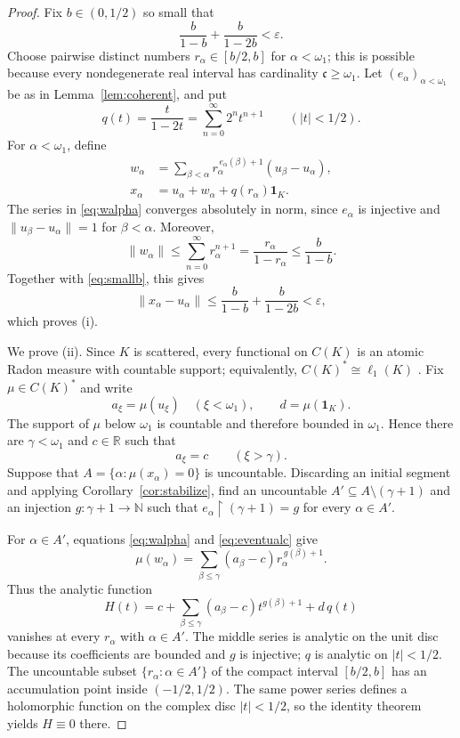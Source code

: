 \documentclass[11pt]{article}
\theoremstyle{remark}
\newcommand{\one}{\mathbf 1}
\newcommand{\N}{\mathbb N}
\newcommand{\R}{\mathbb R}
\begin{document}
\begin{proof}
Fix $b\in(0,1/2)$ so small that
\begin{equation}\label{eq:smallb}
  \frac{b}{1-b}+\frac{b}{1-2b}<\varepsilon.
\end{equation}
Choose pairwise distinct numbers
$r_\alpha\in[b/2,b]$ for $\alpha<\omega_1$; this is possible because every
nondegenerate real interval has cardinality $\mathfrak c\ge\omega_1$.  Let
$(e_\alpha)_{\alpha<\omega_1}$ be as in Lemma~\ref{lem:coherent}, and put
\[
  q(t)=\frac{t}{1-2t}=\sum_{n=0}^{\infty}2^n t^{n+1}
  \qquad(|t|<1/2).
\]
For $\alpha<\omega_1$, define
\begin{align}
  w_\alpha
    &=\sum_{\beta<\alpha}
      r_\alpha^{\,e_\alpha(\beta)+1}(u_\beta-u_\alpha),
      \label{eq:walpha}\\
  x_\alpha
    &=u_\alpha+w_\alpha+q(r_\alpha)\one_K.
      \label{eq:xalpha}
\end{align}
The series in \eqref{eq:walpha} converges absolutely in norm, since
$e_\alpha$ is injective and $\|u_\beta-u_\alpha\|=1$ for $\beta<\alpha$.
Moreover,
\[
  \|w_\alpha\|
  \le\sum_{n=0}^{\infty}r_\alpha^{n+1}
  =\frac{r_\alpha}{1-r_\alpha}
  \le\frac b{1-b}.
\]
Together with \eqref{eq:smallb}, this gives
\[
  \|x_\alpha-u_\alpha\|
  \le \frac b{1-b}+\frac b{1-2b}<\varepsilon,
\]
which proves (i).

We prove (ii).  Since $K$ is scattered, every functional on $C(K)$ is an
atomic Radon measure with countable support; equivalently,
$C(K)^*\cong\ell_1(K)$ \cite{Rudin}.  Fix $\mu\in C(K)^*$ and write
\[
  a_\xi=\mu(u_\xi)\quad(\xi<\omega_1),
  \qquad d=\mu(\one_K).
\]
The support of $\mu$ below $\omega_1$ is countable and therefore bounded in
$\omega_1$.  Hence there are $\gamma<\omega_1$ and $c\in\R$ such that
\begin{equation}\label{eq:eventualc}
  a_\xi=c\qquad(\xi>\gamma).
\end{equation}
Suppose that $A=\{\alpha:\mu(x_\alpha)=0\}$ is uncountable.  Discarding an
initial segment and applying Corollary~\ref{cor:stabilize}, find an uncountable
$A'\subseteq A\setminus(\gamma+1)$ and an injection
$g:\gamma+1\to\N$ such that
$e_\alpha\!\upharpoonright(\gamma+1)=g$ for every $\alpha\in A'$.

For $\alpha\in A'$, equations \eqref{eq:walpha} and
\eqref{eq:eventualc} give
\[
  \mu(w_\alpha)
   =\sum_{\beta\le\gamma}
      (a_\beta-c)r_\alpha^{\,g(\beta)+1}.
\]
Thus the analytic function
\begin{equation}\label{eq:H}
  H(t)=c+
       \sum_{\beta\le\gamma}(a_\beta-c)t^{g(\beta)+1}
       +d\,q(t)
\end{equation}
vanishes at every $r_\alpha$ with $\alpha\in A'$.  The middle series is
analytic on the unit disc because its coefficients are bounded and $g$ is
injective; $q$ is analytic on $|t|<1/2$.  The uncountable subset
$\{r_\alpha:\alpha\in A'\}$ of the compact interval $[b/2,b]$ has an
accumulation point inside $(-1/2,1/2)$.  The same power series defines a
holomorphic function on the complex disc $|t|<1/2$, so the identity theorem
yields $H\equiv0$ there.


\end{proof}
\end{document}
